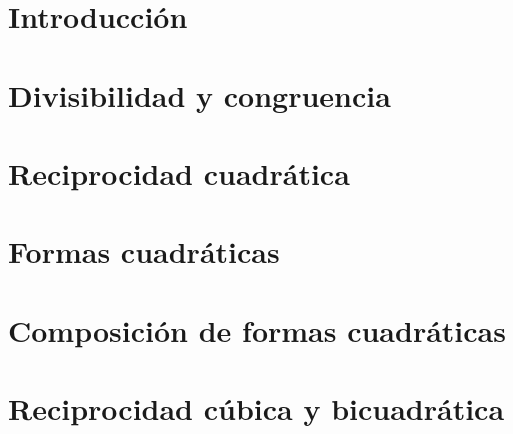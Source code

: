 \part*{Introducci\'on}


\pagebreak
\part{Divisibilidad y congruencia}\label{pt:divisibilidad-y-congruencia}


\pagebreak
\part{Reciprocidad cuadr\'atica}\label{pt:reciprocidad-cuadratica}


\pagebreak
\part{Formas cuadr\'aticas}\label{pt:formas}


\pagebreak
\part{Composici\'on de formas cuadr\'aticas}\label{pt:composicion}

\pagebreak
\part{Reciprocidad c\'ubica y bicuadr\'atica}\label{pt:reciprocidad-superior}



\pagebreak
\printbibliography[heading=bibintoc,title=\refname]

\pagebreak
\tableofcontents
